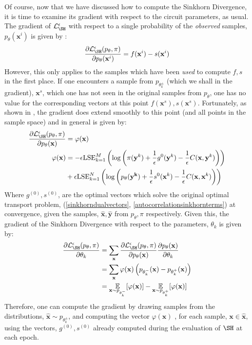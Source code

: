 Of course, now that we have discussed how to compute the Sinkhorn Divergence, it is time to examine its gradient with respect to the circuit parameters, as usual.
The gradient of $\mathcal{L}^\epsilon_{\SH}$ with respect to a single probability of the \textit{observed} samples, $p_\theta(\mathbf{x}^i)$ is given by :
\begin{align}
    \frac{\partial \mathcal{L}_{\SH}^\epsilon(p_\theta, \pi)}{\partial p_\theta(\mathbf{x}^i)} = f(\mathbf{x}^i) - s(\mathbf{x}^i)
\end{align}
However, this only applies to the samples which have been \textit{used} to compute $f, s$ in the first place. If one encounters a sample from $p_{\theta_k^{\pm}}$ (which we shall in the gradient), $\mathbf{x}^s$, which one has not seen in the original samples from $p_\theta$, one has no value for the corresponding vectors at this point $f(\mathbf{x}^s), s(\mathbf{x}^s)$. Fortunately, as shown in , the gradient does extend smoothly to this point (and all points in the sample space) and in general is given by:
\begin{align}
    \frac{\partial \mathcal{L}_{\SH}^\epsilon(p_\theta, \pi)}{\partial p_\theta(\mathbf{x})} &= \varphi(\mathbf{x}) \\
    \varphi(\mathbf{x}) &= -\epsilon \text{LSE}_{k=1}^M\left(\log\left(\pi(\mathbf{\mathbf{y}}^k) + \frac{1}{\epsilon}g^{0}(\mathbf{y}^k) - \frac{1}{\epsilon} C(\mathbf{x}, \mathbf{y}^k)\right)\right)\nonumber\\
    &+ \epsilon \text{LSE}_{k=1}^N\left(\log\left(p_\theta(\mathbf{\mathbf{y}^k}) + \frac{1}{\epsilon}s^{0}(\mathbf{x}^k) - \frac{1}{\epsilon} C(\mathbf{x}, \mathbf{x}^k)\right)\right)
\end{align}
Where $g^{(0)}, s^{(0)}$, are the optimal vectors which solve the original optimal transport problem, (\ref{sinkhorndualvectors}, \ref{autocorrelationsinkhornterms}) at convergence, given the samples, $\hat{\mathbf{x}}, \hat{\mathbf{y}}$ from $p_\theta, \pi$ respectively.
Given this, the gradient of the Sinkhorn Divergence with respect to the parameters, $\theta_k$ is given by:
\begin{align}
    \frac{\partial \mathcal{L}_{\SH}^\epsilon(p_\theta, \pi)}{\partial \theta_k} &= \sum\limits_{\mathbf{x}}\frac{\partial \mathcal{L}_{\SH}^\epsilon(p_\theta, \pi)}{\partial p_\theta(\mathbf{x})}\frac{\partial p_\theta(\mathbf{x})}{\partial \theta_k} \nonumber\\
    & = \sum\limits_\mathbf{x}\varphi(\mathbf{x})\left(p_{\theta^-_k}(\mathbf{x}) - p_{\theta^+_k}(\mathbf{x})\right) \nonumber \\
    & = \underset{\substack{\mathbf{x} \sim p_{\theta_k^-} }}{\mathbb{E}}[\varphi(\mathbf{x})] 
    -\underset{\substack{\mathbf{x} \sim p_{\theta_k^+}  }}{\mathbb{E}}[\varphi(\mathbf{x})] \label{sinkhorngradient}
\end{align}
 Therefore, one can compute the gradient by drawing samples from the distributions, $\hat{\mathbf{x}} \sim p_{\theta_k^\pm}$, and computing the vector $\varphi(\mathbf{x})$ , for each sample, $\mathbf{x} \in \hat{\mathbf{x}}$, using the vectors, $g^{(0)}, s^{(0)}$ already computed during the evaluation of $\SH$ at each epoch.

